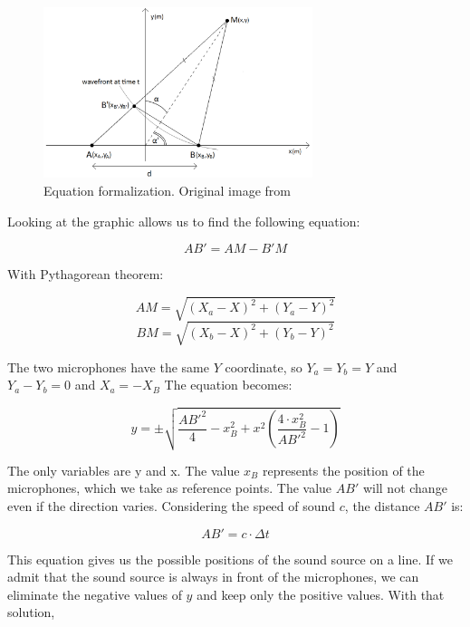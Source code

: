\begin{figure}[H]
    \centering
    \includegraphics[width=0.7\textwidth]{../Images/sound-source-from-two-microphones.png}
    \caption{Equation formalization. Original image from \cite{Scola2010DirectionOA}}
    \label{fig:sound-source-from-two-microphones}
\end{figure}

Looking at the graphic allows us to find the following equation:

\begin{equation}
    AB' = AM-B'M
\end{equation}

With Pythagorean theorem: 

\begin{equation}
    AM = \sqrt{(X_{a}-X)^2 + (Y_{a}-Y)^2}
\end{equation}
\begin{equation}
    BM = \sqrt{(X_{b}-X)^2 + (Y_{b}-Y)^2}
\end{equation}

The two microphones have the same $Y$ coordinate, so $Y_{a} = Y_{b} = Y$ and $Y_{a}-Y_{b} = 0$ and $X_{a} = -X_{B}$ The equation becomes:

\begin{equation}
    y = \pm\sqrt{\frac{AB'^2}{4} - x^2_{B} + x^2(\frac{4\cdot x^2_{B}}{AB'^2} - 1)}
\end{equation}

The only variables are y and x. The value $x_{B}$ represents the position of the microphones, which we take as reference points. The value $AB'$ will not change even if the direction varies. Considering the speed of sound $c$, the distance $AB'$ is:

\begin{equation}
    AB' = c \cdot \Delta t
\end{equation}

This equation gives us the possible positions of the sound source on a line. If we admit that the sound source is always in front of the microphones, we can eliminate the negative values of $y$ and keep only the positive values. With that solution, 


